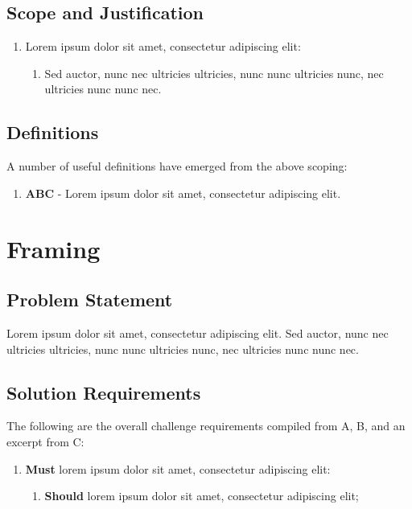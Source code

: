 \documentclass{../../../../docs/tex/report}
\begin{document}
\subsection{Scope and Justification}
\label{sec:scope}

\begin{enumerate}[label=SC\arabic*., ref=SC\arabic*]
    \item \label{sc:1} Lorem ipsum dolor sit amet, consectetur adipiscing elit:
    \begin{enumerate}[label=SC3\alph*., ref=SC3\alph*]
        \item \label{sc:1a} Sed auctor, nunc nec ultricies ultricies, nunc nunc ultricies nunc, nec ultricies nunc nunc nec.
    \end{enumerate}
\end{enumerate}

\subsection{Definitions}
\label{sec:definitions}

A number of useful definitions have emerged from the above scoping:
\begin{enumerate}
    \item \textbf{ABC} - Lorem ipsum dolor sit amet, consectetur adipiscing elit.
\end{enumerate}

\clearpage


\section{Framing}
\label{sec:framing}

\subsection{Problem Statement}
\label{sec:opportunity}

Lorem ipsum dolor sit amet, consectetur adipiscing elit. Sed auctor, nunc nec ultricies ultricies, nunc nunc ultricies nunc, nec ultricies nunc nunc nec.

\subsection{Solution Requirements}
\label{sec:requirements}

The following are the overall challenge requirements compiled from A, B, and an excerpt from C:
\begin{enumerate}[label=R\arabic*., ref=R\arabic*]
    \item \label{r:1} \textbf{Must} lorem ipsum dolor sit amet, consectetur adipiscing elit:
    \begin{enumerate}[ref=R1\alph*]
        \item \label{r:1a} \textbf{Should} lorem ipsum dolor sit amet, consectetur adipiscing elit;
    \end{enumerate}
\end{enumerate}
\end{document}
